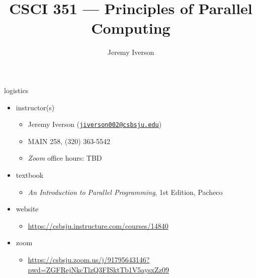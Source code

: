 \documentclass[10pt, t]{beamer}
\title{CSCI 351 --- Principles of Parallel Computing}
\date{}
\author{Jeremy Iverson}
\institute{College of Saint Benedict \& Saint John's University}
\begin{document}
  \maketitle

  \begin{frame}{logistics}
    \begin{itemize}
      \item instructor(s)
        \begin{itemize}
          \item Jeremy Iverson (\href{mailto:jiverson002@csbsju.edu}{\nolinkurl{jiverson002@csbsju.edu}})
          \item MAIN 258, (320) 363-5542
          \item \emph{Zoom} office hours: TBD
        \end{itemize}
      \item textbook
        \begin{itemize}
          \item \emph{An Introduction to Parallel Programming}, 1st Edition,
            Pacheco
        \end{itemize}
      \item website
        \begin{itemize}
          \item \url{https://csbsju.instructure.com/courses/14840}
        \end{itemize}
      \item zoom
        \begin{itemize}
          \item \url{https://csbsju.zoom.us/j/91795643146?pwd=ZGFRejNkcTlzQ3FISktTb1V5aysxZz09}
        \end{itemize}
    \end{itemize}

  \end{frame}
\end{document}

